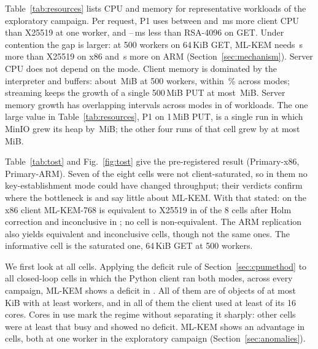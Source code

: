 \documentclass[review,12pt]{elsarticle}
\newcommand{\lab}[1]{\textsf{#1}}
\begin{document}
Table~\ref{tab:resources} lists CPU and memory for representative workloads of the exploratory
campaign. Per request, P1 uses between \HfourBtwoMin{} and \HfourBtwoMax\,ms more client CPU than
X25519 at one worker, and \HfourRoneGetMin--\HfourRoneGetMax\,ms less than RSA-4096 on GET.
Under contention the gap is larger: at 500 workers on 64\,KiB GET, ML-KEM needs
\RevHotCpuDelta\,\textmu s more than X25519 on x86 and \ArmHotCpuDelta\,\textmu s more on ARM
(Section~\ref{sec:mechanism}). Server CPU does not depend on the mode. Client memory is
dominated by the interpreter and buffers: about \MemPeakSmallSat\,MiB at 500 workers, within \MemModeSpreadPct\,\% across modes;
streaming keeps the growth of a single 500\,MiB PUT at most \MemGrowthLargeOne\,MiB. Server
memory growth has overlapping intervals across modes in \ServerGrowthOverlap{} of
\ServerGrowthWorkloads{} workloads. The one large value in Table~\ref{tab:resources}, P1 on
1\,MiB PUT, is a single run in which MinIO grew its heap by \ServerGrowthOneRun\,MiB; the other
four runs of that cell grew by at most \ServerGrowthOtherRuns\,MiB.

\begin{table}[!htbp]
\caption{Exploratory campaign: CPU (\% of the host's 16 vCPU, measured window), client CPU time per request and memory (peak RSS and growth over the run), mean of five runs}
\label{tab:resources}
\centering\footnotesize
{}
\end{table}

Table~\ref{tab:tost} and Fig.~\ref{fig:tost} give the pre-registered result
(\lab{Primary-x86}, \lab{Primary-ARM}). Seven of the eight cells were not client-saturated, so in
them no key-establishment mode could have changed throughput; their verdicts confirm where the
bottleneck is and say little about ML-KEM. With that stated: on the x86 client ML-KEM-768 is
equivalent to X25519 in \RevPrimaryEq{} of the 8 cells after Holm correction and inconclusive
in \RevPrimaryInc; no cell is non-equivalent. The ARM replication also yields \ArmPrimaryEq{}
equivalent and \ArmPrimaryInc{} inconclusive cells, though not the same ones. The informative
cell is the saturated one, 64\,KiB GET at 500 workers.

We first look at all cells. Applying the deficit rule of Section~\ref{sec:cpumethod} to all
\AudSweepCells{} closed-loop cells in which the Python client ran both modes, across every
campaign, ML-KEM shows a deficit in \AudSweepDeficits. All of them are
\AudSweepDeficitOps{} of objects of at most \AudSweepDeficitMaxSizeKiB\,KiB with at least
\AudSweepDeficitMinWorkers{} workers, and in all of them the client used at least
\AudSweepDeficitMinCores{} of its 16 cores. Cores in use mark the regime without separating it
sharply: \AudSweepBusyNoDeficit{} other cells were at least that busy and showed no deficit.
ML-KEM shows an advantage in \AudSweepAdvantages{} cells, both \AudSweepAdvantageOps{} at one
worker in the exploratory campaign (Section~\ref{sec:anomalies}).
\end{document}
